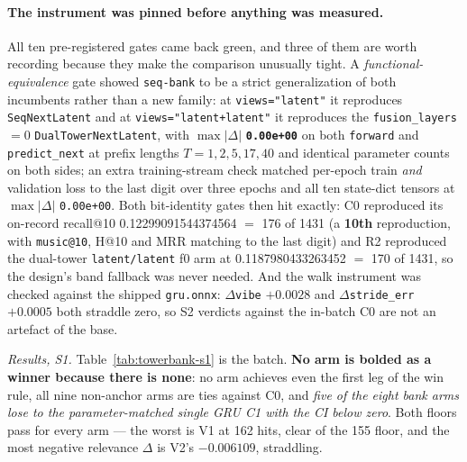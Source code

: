 \documentclass[11pt]{article}
\begin{document}
\paragraph{The instrument was pinned before anything was measured.} All ten
pre-registered gates came back green, and three of them are worth recording
because they make the comparison unusually tight. A \emph{functional-equivalence}
gate showed \texttt{seq-bank} to be a strict generalization of both incumbents
rather than a new family: at \texttt{views="latent"} it reproduces
\texttt{SeqNextLatent} and at \texttt{views="latent+latent"} it reproduces the
\texttt{fusion\_layers}${}=0$ \texttt{DualTowerNextLatent}, with
$\max|\Delta|$ \textbf{\texttt{0.00e+00}} on both \texttt{forward} and
\texttt{predict\_next} at prefix lengths $T=1,2,5,17,40$ and identical parameter
counts on both sides; an extra training-stream check matched per-epoch train
\emph{and} validation loss to the last digit over three epochs and all ten
state-dict tensors at $\max|\Delta|$ \texttt{0.00e+00}. Both bit-identity gates then
hit exactly: C0 reproduced its on-record recall@10
\num{0.12299091544374564} $=$ \num{176} of \num{1431} (a \textbf{10th}
reproduction, with \texttt{music@10}, H@10 and MRR matching to the last digit)
and R2 reproduced the dual-tower \texttt{latent/latent} f0 arm at
\num{0.1187980433263452} $=$ \num{170} of \num{1431}, so the design's band
fallback was never needed. And the walk instrument was checked against the
shipped \texttt{gru.onnx}: $\Delta$\texttt{vibe} $+\num{0.0028}$ and
$\Delta$\texttt{stride\_err} $+\num{0.0005}$ both straddle zero, so S2 verdicts
against the in-batch C0 are not an artefact of the base.

\emph{Results, S1.} Table~\ref{tab:towerbank-s1} is the batch. \textbf{No arm is
bolded as a winner because there is none}: no arm achieves even the first leg of
the win rule, all nine non-anchor arms are ties against C0, and \emph{five of the
eight bank arms lose to the parameter-matched single GRU C1 with the CI below
zero}. Both floors pass for every arm --- the worst is V1 at \num{162} hits,
clear of the \num{155} floor, and the most negative relevance $\Delta$ is V2's
$-\num{0.006109}$, straddling.
\end{document}
